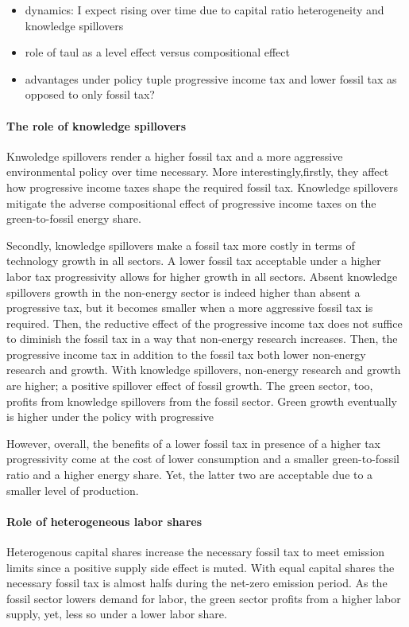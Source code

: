  \begin{itemize}
 	\item dynamics: I expect rising over time due to capital ratio heterogeneity and knowledge spillovers
 	\item role of taul as a level effect versus compositional effect
 	\item advantages under policy tuple progressive income tax and lower fossil tax as opposed to only fossil tax?
 \end{itemize}

\paragraph{The role of knowledge spillovers}
Knwoledge spillovers render a higher fossil tax and a more aggressive environmental policy over time necessary. 
More interestingly,firstly, they affect how progressive income taxes shape the required fossil tax. Knowledge spillovers mitigate the adverse compositional effect of progressive income taxes on the green-to-fossil energy share. %

Secondly, knowledge spillovers make a fossil tax more costly in terms of technology growth in all sectors.  A lower fossil tax acceptable under a higher labor tax progressivity allows for higher growth in all sectors. 
Absent knowledge spillovers growth in the non-energy sector is indeed higher than absent a progressive tax, but it becomes smaller when a more aggressive fossil tax is required. Then, the reductive effect of the progressive income tax does not suffice to diminish the fossil tax in a way that non-energy research increases. Then, the progressive income tax in addition to the fossil tax both lower non-energy research and growth. With knowledge spillovers, non-energy research and growth are higher; a positive spillover effect of fossil growth. The green sector, too, profits from knowledge spillovers from the fossil sector. Green growth eventually is higher under the policy with progressive 

However, overall, the benefits of a lower fossil tax in presence of a higher tax progressivity come at the cost of lower consumption and a smaller green-to-fossil ratio and a higher energy share. Yet, the latter two are acceptable due to a smaller level of production. 

\paragraph{Role of heterogeneous labor shares}
Heterogenous capital shares increase the necessary fossil tax to meet emission limits since a positive supply side effect is muted. 
With equal capital shares the necessary fossil tax is almost halfs during the net-zero emission period. 
As the fossil sector lowers demand for labor, the green sector profits from a higher labor supply, yet, less so under a lower labor share.  


